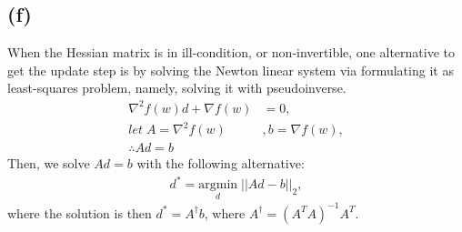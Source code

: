 \documentclass[a4paper,12pt]{article}
\begin{document}
\subsection*{(f)}
\noindent When the Hessian matrix is in ill-condition, or non-invertible, 
one alternative to get the update step is by solving the Newton linear system via 
formulating it as least-squares problem, namely, solving it with pseudoinverse.
\begin{align*}
   \nabla^2 f(w) d + \nabla f(w) &= 0,\\
   let \; A=\nabla^2 f(w)&, b = \nabla f(w),\\
   \therefore Ad =b
\end{align*}
Then, we solve $Ad=b$ with the following alternative:
\begin{align*}
   d^{*} = \underset{d}{\mathrm{argmin}} \;||Ad-b||_2,
\end{align*}
where the solution is then $d^{*} = A^{\dagger}b$, where $A^{\dagger} = (A^TA)^{-1}A^T$.






    







\end{document}
